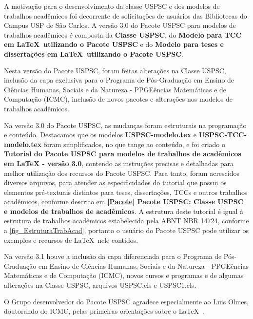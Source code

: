 \begin{agradecimentos}
	A motiva\c{c}\~ao para o desenvolvimento da classe USPSC e dos modelos de trabalhos acad\^emicos foi decorrente de solicita\c{c}\~oes de usu\'arios das Bibliotecas do Campus USP de S\~ao Carlos. A vers\~ao 3.0 do Pacote USPSC para modelos de trabalhos acad\^emicos \'e composta da \textbf{Classe USPSC}, do \textbf{Modelo para TCC em \LaTeX\ utilizando o Pacote USPSC} e do \textbf{Modelo para teses e disserta\c{c}\~oes em \LaTeX\ utilizando o Pacote USPSC}.
	
	Nesta vers\~ao do Pacote USPSC, foram feitas altera\c{c}\~oes na Classe USPSC, inclus\~ao da capa exclusiva para o Programa de P\'os-Gradua\c{c}\~ao em Ensino de Ci\^encias Humanas, Sociais e da Natureza - PPGE\^encias Matem\'aticas e de Computa\c{c}\~ao (ICMC), inclus\~ao de novos pacotes e altera\c{c}\~oes nos modelos de trabalhos acad\^emicos.
	
	Na vers\~ao 3.0 do Pacote USPSC, as mudan\c{c}as foram estruturais na programa\c{c}\~ao e conte\'udo. Destacamos que os modelos \textbf{USPSC-modelo.tex} e \textbf{USPSC-TCC-modelo.tex} foram simplificados, no que tange ao conte\'udo, e foi criado o \textbf{Tutorial do Pacote USPSC para modelos de trabalhos de acad\^emicos em LaTeX - vers\~ao 3.0}, contendo as instru\c{c}\~oes precisas e detalhadas para melhor utiliza\c{c}\~ao dos recursos do Pacote USPSC. Para tanto, foram acrescidos diversos arquivos, para atender as especificidades do tutorial que possui os elementos pr\'e-textuais distintos para teses, disserta\c{c}\~oes, TCCs e outros trabalhos acad\^emicos, conforme descrito em  \textbf{\ref{Pacote} Pacote USPSC: Classe USPSC e modelos de trabalhos de acad\^emicos}. A estrutura deste tutorial \'e igual \`a  estrutura de trabalhos acad\^emicos estabelecida pela ABNT NBR 14724, conforme a \autoref{fig_EstruturaTrabAcad}, portanto o usu\'ario do Pacote USPSC pode utilizar os exemplos e recursos de \LaTeX\ nele contidos.	
	 
	Na vers\~ao 3.1 houve a inclus\~ao da capa diferenciada para o Programa de P\'os-Gradua\c{c}\~ao em Ensino de Ci\^encias Humanas, Sociais e da Natureza - PPGE\^encias Matem\'aticas e de Computa\c{c}\~ao (ICMC), novos cursos e programas e de algumas altera\c{c}\~oes na Classe USPSC, arquivos USPSC.cls e  USPSC1.cls.
	
	O Grupo desenvolvedor do Pacote USPSC agradece especialmente ao Luis Olmes, doutorando do ICMC, pelas primeiras orienta\c{c}\~oes sobre o \LaTeX\ . 
	

\end{agradecimentos}
